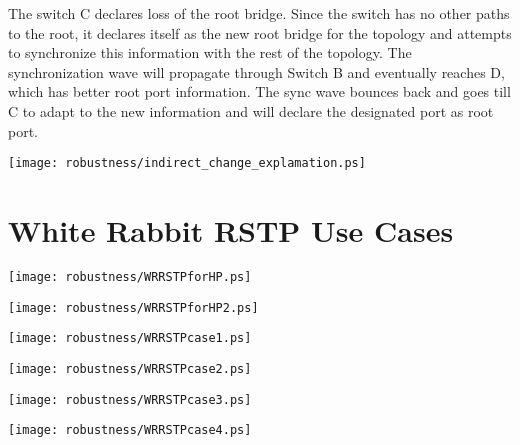 The switch C declares loss of the root bridge. Since the switch has no other 
paths to the root, it declares
itself as the new root bridge for the topology and attempts to synchronize  this
information with the rest of 
the topology. The synchronization wave will propagate through Switch B and 
eventually reaches D, which has better root port information. The sync wave
bounces back and goes till C to adapt to the new information and will declare
the designated port as root port.

\begin{center}
        \texttt{[image: robustness/indirect\_change\_explamation.ps]}
        \label{fig:indirect_change}
\end{center}

\section{White Rabbit RSTP Use Cases}

\begin{center}
	\texttt{[image: robustness/WRRSTPforHP.ps]}
	\label{fig:WRRSTPforHP}
\end{center}

\begin{center}
	\texttt{[image: robustness/WRRSTPforHP2.ps]}
	\label{fig:WRRSTPforHP2}
\end{center}

\begin{center}
	\texttt{[image: robustness/WRRSTPcase1.ps]}
	\label{fig:WRRSTPcase1}
\end{center}

\begin{center}
	\texttt{[image: robustness/WRRSTPcase2.ps]}
	\label{fig:WRRSTPcase2}
\end{center}
\begin{center}
	\texttt{[image: robustness/WRRSTPcase3.ps]}
	\label{fig:WRRSTPcase3}
\end{center}

\begin{center}
	\texttt{[image: robustness/WRRSTPcase4.ps]}
	\label{fig:WRRSTPcase4}
\end{center}

